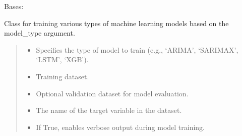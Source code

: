 \documentclass[letterpaper,10pt,english]{sphinxmanual}
\begin{document}
\begin{fulllineitems}
\label{\detokenize{docs/training_module:training_module.ModelTraining}}
\pysigstartsignatures
{}
\pysigstopsignatures
\sphinxAtStartPar
Bases: 

\sphinxAtStartPar
Class for training various types of machine learning models based on the \textendash{}model\_type argument.
\begin{quote}\begin{description}
\begin{itemize}
\item {} 
\sphinxAtStartPar
{} \textendash{} Specifies the type of model to train (e.g., ‘ARIMA’, ‘SARIMAX’, ‘LSTM’, ‘XGB’).

\item {} 
\sphinxAtStartPar
{} \textendash{} Training dataset.

\item {} 
\sphinxAtStartPar
{} \textendash{} Optional validation dataset for model evaluation.

\item {} 
\sphinxAtStartPar
{} \textendash{} The name of the target variable in the dataset.

\item {} 
\sphinxAtStartPar
{} \textendash{} If True, enables verbose output during model training.

\end{itemize}

\end{description}\end{quote}


\end{fulllineitems}
\end{document}
